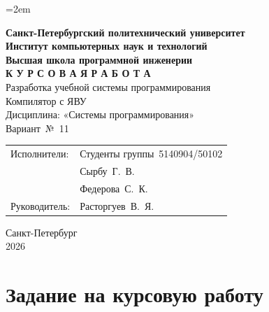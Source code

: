 \documentclass[a4paper,14pt]{extarticle}
\begin{document}
\sloppy
\emergencystretch=2em

\thispagestyle{empty}
\begin{center}
  \textbf{Санкт-Петербургский политехнический университет}\\
  \textbf{Институт компьютерных наук и технологий}\\
  \textbf{Высшая школа программной инженерии}\\[3cm]

  {\Large\textbf{К У Р С О В А Я \quad Р А Б О Т А}}\\[1cm]
  {\large Разработка учебной системы программирования}\\[0.5cm]
  {\large Компилятор с ЯВУ}\\[2cm]

  Дисциплина: «Системы программирования»\\[1cm]
  Вариант~№~11\\[2cm]
\end{center}

\begin{flushright}
  \begin{tabular}{ll}
    Исполнители: & Студенты группы~5140904/50102\\
                 & Сырбу~Г.~В.\\
                 & Федерова~С.~К.\\[0.5cm]
    Руководитель: & Расторгуев~В.~Я.\\
  \end{tabular}
\end{flushright}

\vfill
\begin{center}
  Санкт-Петербург\\
  2026
\end{center}

\newpage

\tableofcontents
\newpage

\section{Задание на курсовую работу}
\end{document}
